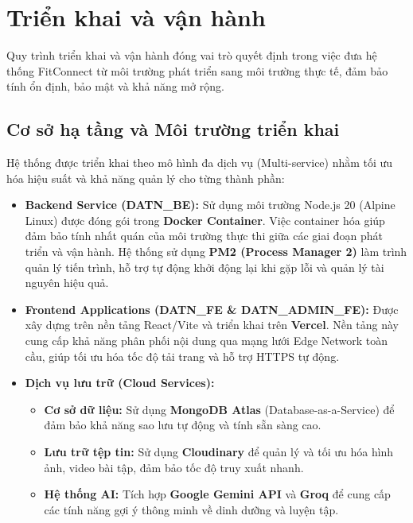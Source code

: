 \section{Triển khai và vận hành}
\label{sec:impl_deployment}

Quy trình triển khai và vận hành đóng vai trò quyết định trong việc đưa hệ thống FitConnect từ môi trường phát triển sang môi trường thực tế, đảm bảo tính ổn định, bảo mật và khả năng mở rộng.

\subsection{Cơ sở hạ tầng và Môi trường triển khai}
\label{subsec:impl_infrastructure}

Hệ thống được triển khai theo mô hình đa dịch vụ (Multi-service) nhằm tối ưu hóa hiệu suất và khả năng quản lý cho từng thành phần:
\begin{itemize}
    \item \textbf{Backend Service (DATN\_BE):} Sử dụng môi trường Node.js 20 (Alpine Linux) được đóng gói trong \textbf{Docker Container}. Việc container hóa giúp đảm bảo tính nhất quán của môi trường thực thi giữa các giai đoạn phát triển và vận hành. Hệ thống sử dụng \textbf{PM2 (Process Manager 2)} làm trình quản lý tiến trình, hỗ trợ tự động khởi động lại khi gặp lỗi và quản lý tài nguyên hiệu quả.
    \item \textbf{Frontend Applications (DATN\_FE \& DATN\_ADMIN\_FE):} Được xây dựng trên nền tảng React/Vite và triển khai trên \textbf{Vercel}. Nền tảng này cung cấp khả năng phân phối nội dung qua mạng lưới Edge Network toàn cầu, giúp tối ưu hóa tốc độ tải trang và hỗ trợ HTTPS tự động.
    \item \textbf{Dịch vụ lưu trữ (Cloud Services):}
    \begin{itemize}
        \item \textbf{Cơ sở dữ liệu:} Sử dụng \textbf{MongoDB Atlas} (Database-as-a-Service) để đảm bảo khả năng sao lưu tự động và tính sẵn sàng cao.
        \item \textbf{Lưu trữ tệp tin:} Sử dụng \textbf{Cloudinary} để quản lý và tối ưu hóa hình ảnh, video bài tập, đảm bảo tốc độ truy xuất nhanh.
        \item \textbf{Hệ thống AI:} Tích hợp \textbf{Google Gemini API} và \textbf{Groq} để cung cấp các tính năng gợi ý thông minh về dinh dưỡng và luyện tập.
    \end{itemize}
\end{itemize}

